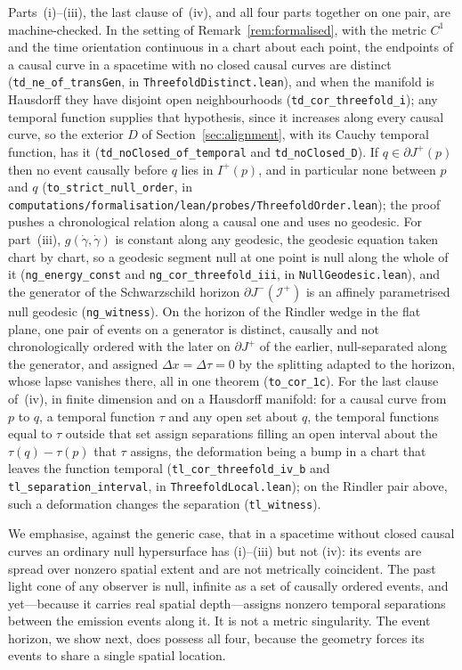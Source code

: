 \documentclass[11pt,a4paper]{article}
\theoremstyle{plain}
\theoremstyle{remark}
\begin{document}
Parts~(i)--(iii), the last clause of~(iv), and all four parts together on one pair, are machine-checked. In the setting of Remark~\ref{rem:formalised}, with the metric $C^{1}$ and the time orientation continuous in a chart about each point, the endpoints of a causal curve in a spacetime with no closed causal curves are distinct (\texttt{td\_ne\_of\_transGen}, in \texttt{ThreefoldDistinct.lean}), and when the manifold is Hausdorff they have disjoint open neighbourhoods (\texttt{td\_cor\_threefold\_i}); any temporal function supplies that hypothesis, since it increases along every causal curve, so the exterior $D$ of Section~\ref{sec:alignment}, with its Cauchy temporal function, has it (\texttt{td\_noClosed\_of\_temporal} and \texttt{td\_noClosed\_D}). If $q\in\partial J^{+}(p)$ then no event causally before $q$ lies in $I^{+}(p)$, and in particular none between $p$ and $q$ (\texttt{to\_strict\_null\_order}, in \texttt{computations/formalisation/lean/probes/ThreefoldOrder.lean}); the proof pushes a chronological relation along a causal one and uses no geodesic. For part~(iii), $g(\dot\gamma,\dot\gamma)$ is constant along any geodesic, the geodesic equation taken chart by chart, so a geodesic segment null at one point is null along the whole of it (\texttt{ng\_energy\_const} and \texttt{ng\_cor\_threefold\_iii}, in \texttt{NullGeodesic.lean}), and the generator of the Schwarzschild horizon $\partial J^-(\mathscr{I}^+)$ is an affinely parametrised null geodesic (\texttt{ng\_witness}). On the horizon of the Rindler wedge in the flat plane, one pair of events on a generator is distinct, causally and not chronologically ordered with the later on $\partial J^{+}$ of the earlier, null-separated along the generator, and assigned $\Delta x=\Delta\tau=0$ by the splitting adapted to the horizon, whose lapse vanishes there, all in one theorem (\texttt{to\_cor\_1c}). For the last clause of~(iv), in finite dimension and on a Hausdorff manifold: for a causal curve from $p$ to $q$, a temporal function $\tau$ and any open set about $q$, the temporal functions equal to $\tau$ outside that set assign separations filling an open interval about the $\tau(q)-\tau(p)$ that $\tau$ assigns, the deformation being a bump in a chart that leaves the function temporal (\texttt{tl\_cor\_threefold\_iv\_b} and \texttt{tl\_separation\_interval}, in \texttt{ThreefoldLocal.lean}); on the Rindler pair above, such a deformation changes the separation (\texttt{tl\_witness}).

We emphasise, against the generic case, that in a spacetime without closed causal curves an ordinary null hypersurface has (i)--(iii) but not (iv): its events are spread over nonzero spatial extent and are not metrically coincident. The past light cone of any observer is null, infinite as a set of causally ordered events, and yet---because it carries real spatial depth---assigns nonzero temporal separations between the emission events along it. It is not a metric singularity. The event horizon, we show next, does possess all four, because the geometry forces its events to share a single spatial location.
\end{document}
